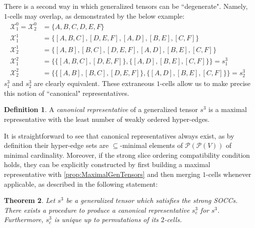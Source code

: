 \documentclass{article}
\theoremstyle{plain}
\newtheorem{theorem}{Theorem}[section]
\theoremstyle{definition}
\newtheorem{definition}[theorem]{Definition}
\theoremstyle{remark}
\newcommand{\cX}{\mathcal{X}}
\newcommand{\cP}{\mathcal{P}}
\begin{document}
There is a second way in which generalized tensors can be ``degenerate". Namely, $1$-cells may overlap, as demonstrated by the below example:
\begin{equation}
	\begin{aligned}
		\cX^0_1 = \cX^0_2 &= \{A, B, C, D, E, F\}\\
		\cX^1_1 &= \big\{ [A, B, C], [D, E, F], [A, D], [B, E], [C, F] \big\}\\
		\cX^1_2 &= \big\{ [A, B], [B, C], [D, E, F], [A, D], [B, E], [C, F] \big\}\\
		\cX^2_1 &= \bigg\{ \big\{ [A, B, C], [D, E, F] \big\}, \big\{ [A, D], [B, E], [C, F] \big\} \bigg\} = s^3_1\\
		\cX^2_2 &= \bigg\{ \big\{ [A, B], [B, C], [D, E, F] \big\}, \big\{ [A, D], [B, E], [C, F] \big\} \bigg\} = s^3_2
	\end{aligned}
	\label{eq:NonCanonicalRep}
\end{equation}
$s^3_1$ and $s^3_2$ are clearly equivalent. These extraneous $1$-cells allow us to make precise this notion of ``canonical" representatives.
\begin{definition}
	A \textit{canonical representative} of a generalized tensor $s^3$ is a maximal representative with the least number of weakly ordered hyper-edges.
	\label{def:CanonicalRep}
\end{definition}
It is straightforward to see that canonical representatives always exist, as by definition their hyper-edge sets are $\subseteq$-minimal elements of $\cP(\cP(V))$ of minimal cardinality. Moreover, if the strong slice ordering compatibility condition holds, they can be explicitly constructed by first building a maximal representative with \cref{prop:MaximalGenTensors} and then merging $1$-cells whenever applicable, as described in the following statement:
\begin{theorem}
	Let $s^3$ be a generalized tensor which satisfies the strong SOCCs. There exists a procedure to produce a canonical representative $s^3_c$ for $s^3$. Furthermore, $s^3_c$ is unique up to permutations of its $2$-cells.
	\label{thrm:CanonicalRepsExist}
\end{theorem}
\end{document}
